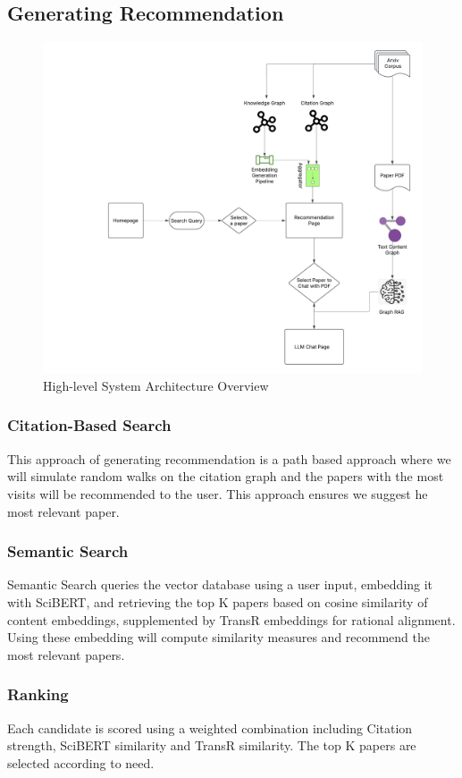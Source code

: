 \documentclass[a4paper,12pt]{article}
\begin{document}
\subsection{Generating Recommendation}
\begin{figure}[H]
    \centering
    \includegraphics[width=15cm]{architecture.png}
    \caption{High-level System Architecture Overview}
\end{figure}

\subsubsection{Citation-Based Search}
This approach of generating recommendation is a path based approach where we will
simulate random walks on the citation graph and the papers with the most visits will
be recommended to the user. This approach ensures we suggest he most relevant paper.

\subsubsection{Semantic Search}
Semantic Search queries the vector database using a user input, embedding it with
SciBERT, and retrieving the top K papers based on cosine similarity of content
embeddings, supplemented by TransR embeddings for rational alignment. Using these
embedding will compute similarity measures and recommend the most relevant papers.

\subsubsection{Ranking}
Each candidate is scored using a weighted combination including Citation strength,
SciBERT similarity and TransR similarity. The top K papers are selected according
to need.
\end{document}

